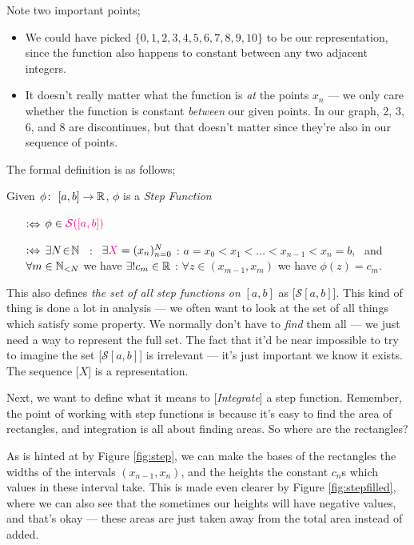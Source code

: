 \medskip
Note two important points;
\begin{itemize}
	\item We could have picked $\{0, 1, 2, 3, 4, 5, 6, 7, 8, 9, 10\}$ to be our representation, since the function also happens to constant between any two adjacent integers. 
	\item It doesn't really matter what the function is {\em at} the points $x_n$ --- we only care whether the function is constant {\em between} our given points. In our graph, 2, 3, 6, and 8 are discontinues, but that doesn't matter since they're also in our sequence of points. 
\end{itemize}

The formal definition is as follows;
\begin{definition}\label{def:stfun}
Given $\phi\colon \ [a, b] \rightarrow \mathbb{R}$, $\phi$ is a {\color{Magenta}\emph{Step Function}}
    \begin{itemize}
        \item[$\mathrel{\vcentcolon\Leftrightarrow}$]
            $\phi \in {\color{Magenta}\mathcal{S}([a, b])}$
        \item[$\mathrel{\vcentcolon\Leftrightarrow}$]
            $\exists N \! \in \! \mathbb{N}$ \ : \ $\exists {\color{Magenta}X} = (x_n)_{n=0}^N$ : $a = x_0 < x_1 < \ldots < x_{n-1} < x_n = b$, \ and \ $\forall m\in\mathbb{N}_{< N}$ we have $\exists! c_m \in \mathbb{R}$ : $\forall z \in (x_{m-1}, x_{m})$ we have $\phi(z) = c_m$.
    \end{itemize}
\end{definition}

This also defines \emph{the set of all step functions on} $[a, b]$ as [\emph{$\mathcal{S}[a, b]$}]. This kind of thing is done a lot in analysis --- we often want to look at the set of all things which satisfy some property. We normally don't have to \emph{find} them all --- we just need a way to represent the full set. The fact that it'd be near impossible to try to imagine the set [\emph{$\mathcal{S}[a, b]$}] is irrelevant --- it's just important we know it exists. The sequence [$X$] is a representation.

\medskip
Next, we want to define what it means to [\emph{Integrate}] a step function. Remember, the point of working with step functions is because it's easy to find the area of rectangles, and integration is all about finding areas. So where are the rectangles? 

\medskip
As is hinted at by Figure \ref{fig:step}, we can make the bases of the rectangles the widths of the intervals $(x_{n-1}, x_n)$, and the heights the constant $c_n$s which values in these interval take. This is made even clearer by Figure \ref{fig:stepfilled}, where we can also see that the sometimes our heights will have negative values, and that's okay --- these areas are just taken away from the total area instead of added.
 
